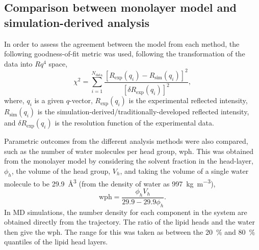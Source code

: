 \subsection{Comparison between monolayer model and simulation-derived analysis}
In order to assess the agreement between the model from each method, the following goodness-of-fit metric was used, following the transformation of the data into $Rq^4$ space,
%
\begin{equation}
\chi^2 = \sum_{i=1}^{N_{\text{data}}}{\frac{[R_{\text{exp}}(q_i) - R_{\text{sim}}(q_i)]^2}{[\delta R_{\text{exp}}(q_i)]^2}},
\end{equation}
%
where, $q_i$ is a given $q$-vector, $R_{\text{exp}}(q_i)$ is the experimental reflected intensity, $R_{\text{sim}}(q_i)$ is the simulation-derived/traditionally-developed reflected intensity, and $\delta R_{\text{exp}}(q_i)$ is the resolution function of the experimental data.

Parametric outcomes from the different analysis methods were also compared, such as the number of water molecules per head group, wph.
This was obtained from the monolayer model by considering the solvent fraction in the head-layer, $\phi_h$, the volume of the head group, $V_h$, and taking the volume of a single water molecule to be \SI{29.9}{\angstrom\cubed} (from the density of water as \SI{997}{\kg\per\meter\cubed}),
%
\begin{equation}
\text{wph}=\frac{\phi_h V_h}{29.9 - 29.9\phi_h}.
\label{equ:wph}
\end{equation}
%
In MD simulations, the number density for each component in the system are obtained directly from the trajectory.
The ratio of the lipid heads and the water then give the wph.
The range for this was taken as between the \SI{20}{\percent} and \SI{80}{\percent} quantiles of the lipid head layers.
